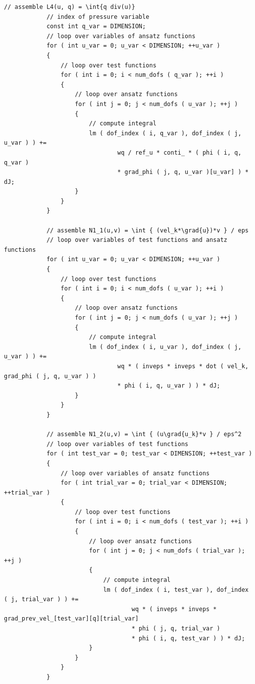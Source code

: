 \documentclass{article}
\begin{document}
\begin{lstlisting}[firstnumber=264]
            // assemble L4(u, q) = \int{q div(u)}
            // index of pressure variable
            const int q_var = DIMENSION;
            // loop over variables of ansatz functions
            for ( int u_var = 0; u_var < DIMENSION; ++u_var )
            {
                // loop over test functions
                for ( int i = 0; i < num_dofs ( q_var ); ++i )
                {
                    // loop over ansatz functions
                    for ( int j = 0; j < num_dofs ( u_var ); ++j )
                    {
                        // compute integral
                        lm ( dof_index ( i, q_var ), dof_index ( j, u_var ) ) +=
                                wq / ref_u * conti_ * ( phi ( i, q, q_var )
                                * grad_phi ( j, q, u_var )[u_var] ) * dJ;
                    }
                }
            }

            // assemble N1_1(u,v) = \int { (vel_k*\grad{u})*v } / eps
            // loop over variables of test functions and ansatz functions
            for ( int u_var = 0; u_var < DIMENSION; ++u_var )
            {
                // loop over test functions
                for ( int i = 0; i < num_dofs ( u_var ); ++i )
                {
                    // loop over ansatz functions
                    for ( int j = 0; j < num_dofs ( u_var ); ++j )
                    {
                        // compute integral
                        lm ( dof_index ( i, u_var ), dof_index ( j, u_var ) ) +=
                                wq * ( inveps * inveps * dot ( vel_k, grad_phi ( j, q, u_var ) )
                                * phi ( i, q, u_var ) ) * dJ;
                    }
                }
            }

            // assemble N1_2(u,v) = \int { (u\grad{u_k}*v } / eps^2
            // loop over variables of test functions
            for ( int test_var = 0; test_var < DIMENSION; ++test_var )
            {
                // loop over variables of ansatz functions
                for ( int trial_var = 0; trial_var < DIMENSION; ++trial_var )
                {
                    // loop over test functions
                    for ( int i = 0; i < num_dofs ( test_var ); ++i )
                    {
                        // loop over ansatz functions
                        for ( int j = 0; j < num_dofs ( trial_var ); ++j )
                        {
                            // compute integral
                            lm ( dof_index ( i, test_var ), dof_index ( j, trial_var ) ) +=
                                    wq * ( inveps * inveps * grad_prev_vel_[test_var][q][trial_var]
                                    * phi ( j, q, trial_var )
                                    * phi ( i, q, test_var ) ) * dJ;
                        }
                    }
                }
            }


\end{lstlisting}
\end{document}
